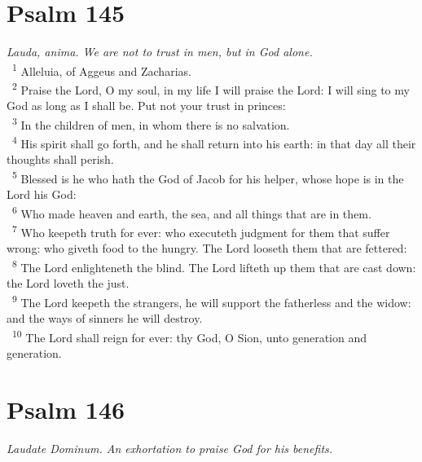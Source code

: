 \documentclass[a5paper,12pt]{article}
\begin{document}
\begin{multicols*}{2}
\section{Psalm 145}
\label{sec:orgf85206b}
\emph{Lauda, anima. We are not to trust in men, but in God alone.}\\

~\textsuperscript{1} Alleluia, of Aggeus and Zacharias.\\
~\textsuperscript{2} Praise the Lord, O my soul, in my life I will praise the Lord: I will sing to my God as long as I shall be. Put not your trust in princes:\\
~\textsuperscript{3} In the children of men, in whom there is no salvation.\\
~\textsuperscript{4} His spirit shall go forth, and he shall return into his earth: in that day all their thoughts shall perish.\\
~\textsuperscript{5} Blessed is he who hath the God of Jacob for his helper, whose hope is in the Lord his God:\\
~\textsuperscript{6} Who made heaven and earth, the sea, and all things that are in them.\\
~\textsuperscript{7} Who keepeth truth for ever: who executeth judgment for them that suffer wrong: who giveth food to the hungry. The Lord looseth them that are fettered:\\
~\textsuperscript{8} The Lord enlighteneth the blind. The Lord lifteth up them that are cast down: the Lord loveth the just.\\
~\textsuperscript{9} The Lord keepeth the strangers, he will support the fatherless and the widow: and the ways of sinners he will destroy.\\
~\textsuperscript{10} The Lord shall reign for ever: thy God, O Sion, unto generation and generation.\\

\section{Psalm 146}
\label{sec:org1dfeda0}
\emph{Laudate Dominum. An exhortation to praise God for his benefits.}\\


\end{multicols*}
\end{document}
